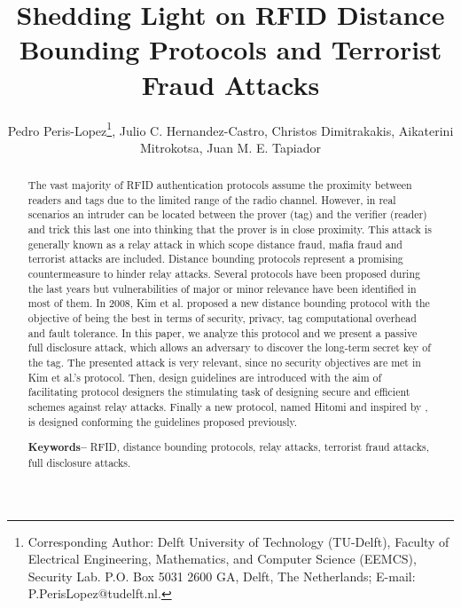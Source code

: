 \documentclass{article}
\begin{document}
\title{Shedding Light on RFID Distance Bounding Protocols and Terrorist Fraud Attacks}
\author{Pedro Peris-Lopez\footnote{Corresponding Author: Delft University of Technology (TU-Delft),
Faculty of Electrical Engineering, Mathematics, and Computer Science (EEMCS),
Security Lab. P.O. Box 5031
2600 GA, Delft, The Netherlands; E-mail: P.PerisLopez@tudelft.nl.}, Julio C. Hernandez-Castro, Christos Dimitrakakis, Aikaterini Mitrokotsa, Juan M. E. Tapiador}

\maketitle
\begin{abstract}
The vast majority of RFID authentication protocols assume the proximity between readers and tags due to the limited range of the radio channel. However, in real scenarios an intruder can be located between the prover (tag) and the verifier (reader) and trick this last one into thinking that the prover is in close proximity. This attack is generally known as a relay attack in which scope distance fraud, mafia fraud and terrorist attacks are included.  Distance bounding protocols represent a promising countermeasure to hinder relay attacks. Several protocols have been proposed during the last years but vulnerabilities of major or minor relevance have been identified in most of them.  In 2008, Kim et al. \cite{KimAKSP-2008-icisc} proposed a new distance bounding protocol with the objective of being the best in terms of security, privacy, tag computational overhead and fault tolerance. In this paper, we analyze this protocol and we present a passive full disclosure attack, which allows an adversary to discover the long-term secret key of the tag.  The presented attack is very relevant, since no security objectives are met in Kim et al.'s protocol. Then, design guidelines are introduced with the aim of facilitating protocol designers the stimulating task of designing secure and efficient schemes against relay attacks. Finally a new protocol, named Hitomi and inspired by \cite{KimAKSP-2008-icisc}, is designed conforming the guidelines proposed previously.


\textbf{Keywords--} RFID, distance bounding protocols, relay attacks, terrorist fraud attacks, full disclosure attacks.
\end{abstract}
\end{document}
